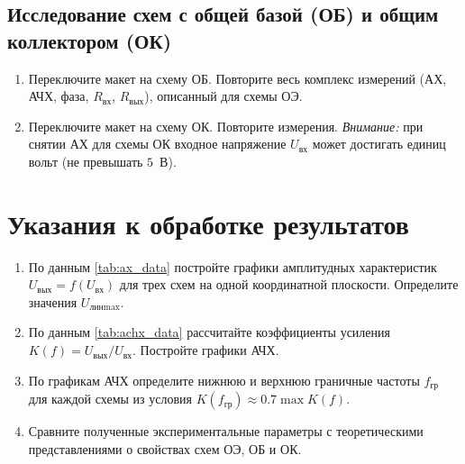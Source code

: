\subsection*{Исследование схем с общей базой (ОБ) и общим коллектором (ОК)}
\begin{enumerate}
    \item Переключите макет на схему ОБ. Повторите весь комплекс измерений (АХ, АЧХ, фаза, $R_{\text{вх}}$, $R_{\text{вых}}$), описанный для схемы ОЭ.
    \item Переключите макет на схему ОК. Повторите измерения. \textit{Внимание:} при снятии АХ для схемы ОК входное напряжение $U_{\text{вх}}$ может достигать единиц вольт (не превышать $5$~В).
\end{enumerate}

\section*{Указания к обработке результатов}
\begin{enumerate}
    \item По данным \cref{tab:ax_data} постройте графики амплитудных характеристик $U_{\text{вых}} = f(U_{\text{вх}})$ для трех схем на одной координатной плоскости. Определите значения $U_{\text{лин}\max}$.
    \item По данным \cref{tab:achx_data} рассчитайте коэффициенты усиления $K(f) = U_{\text{вых}} / U_{\text{вх}}$. Постройте графики АЧХ.
    \item По графикам АЧХ определите нижнюю и верхнюю граничные частоты $f_{\text{гр}}$ для каждой схемы из условия $K(f_{\text{гр}}) \approx 0.7 \max K(f)$.
    \item Сравните полученные экспериментальные параметры с теоретическими представлениями о свойствах схем ОЭ, ОБ и ОК.
\end{enumerate}